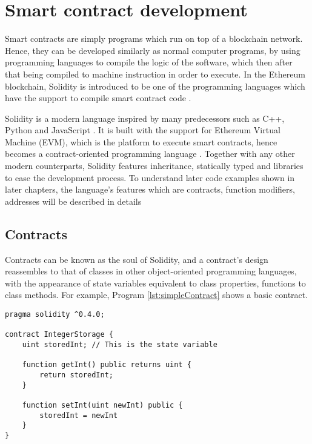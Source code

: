 \chapter{Smart contract development}
\label{ch:smartcontractdev}

Smart contracts are simply programs which run on top of a blockchain network. Hence, they can be developed similarly as normal computer programs, by using programming languages to compile the logic of the software, which then after that being compiled to machine instruction in order to execute. In the Ethereum blockchain, Solidity is introduced to be one of the programming languages which have the support to compile smart contract code \citep{SolidityDocumentation}. 

Solidity is a modern language inspired by many predecessors such as C++, Python and JavaScript \citep{SolidityDocumentation}. It is built with the support for Ethereum Virtual Machine (EVM), which is the platform to execute smart contracts, hence becomes a contract-oriented programming language \citep{SolidityDocumentation}. Together with any other modern counterparts, Solidity features inheritance, statically typed and libraries to ease the development process. To understand later code examples shown in later chapters, the language's features which are contracts, function modifiers, addresses will be described in details

\section{Contracts}

Contracts can be known as the soul of Solidity, and a contract's design reassembles to that of classes in other object-oriented programming languages, with the appearance of state variables equivalent to class properties, functions to class methods. For example, Program \ref{lst:simpleContract} shows a basic contract.

\begin{lstlisting}[float,caption={A simple contract in Solidity.},label={lst:simpleContract},language=Solidity]
pragma solidity ^0.4.0;

contract IntegerStorage {
    uint storedInt; // This is the state variable
    
    function getInt() public returns uint {
        return storedInt;
    }
    
    function setInt(uint newInt) public {
        storedInt = newInt
    }
}
\end{lstlisting}
\label{lst:simpleContract}

